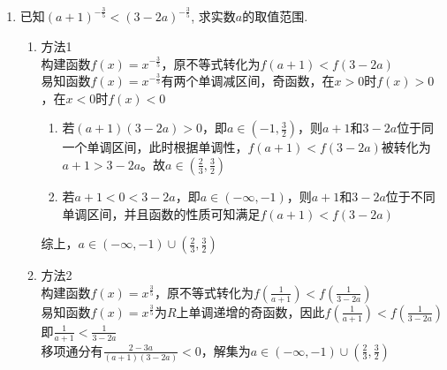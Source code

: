 \begin{enumerate}
\begin{jieda}
    任取实数集内的$x_1, x_2, x_1 < x_2$ \\
    $f(x_2)-f(x_1)=\frac{a}{a^2-1}\left(a^{x_2}-a^{x_1} - (a^{-x_2} - a^{-x_1})\right)$. 
    \begin{enumerate}
        \item 当$0 < a < 1$时,$a^{x_2}-a^{x_1} < 0$，$a^{-x_2} - a^{-x_1} > 0$，$\frac{a}{a^2-1} < 0$，故$f(x_2)-f(x_1) > 0$
        \item 当$a > 1$时,$a^{x_2}-a^{x_1} > 0$，$a^{-x_2} - a^{-x_1} < 0$，$\frac{a}{a^2-1} > 0$，故$f(x_2)-f(x_1) > 0$
    \end{enumerate}
    因此$f(x)$是$\bR$上为严格增函数. \\
    \ps $f(x)$并非恒正或者恒负，因此不应使用作商法.
    \end{jieda}
    \item 已知$(a+1)^{-\frac{3}{5}}<(3-2a)^{-\frac{3}{5}}$, 求实数$a$的取值范围. 
    \begin{jieda}
    \begin{enumerate}
        \item 方法1 \\
        构建函数$f(x) = x^{-\frac{3}{5}}$，原不等式转化为$f(a+1) < f(3-2a)$ \\
        易知函数$f(x) = x^{-\frac{3}{5}}$有两个单调减区间，奇函数，在$x > 0$时$f(x) > 0$，在$x < 0$时$f(x) < 0$ 
        \begin{enumerate}
            \item 若$(a+1)(3-2a) > 0$，即$a \in (-1, \frac{3}{2})$，则$a+1$和$3-2a$位于同一个单调区间，此时根据单调性，$f(a+1) < f(3-2a)$被转化为$a+1 > 3-2a$。故$a \in (\frac{2}{3}, \frac{3}{2})$
            \item 若$a+1< 0 < 3-2a$，即$a \in (-\infty, -1)$，则$a+1$和$3-2a$位于不同单调区间，并且函数的性质可知满足$f(a+1) < f(3-2a)$
        \end{enumerate}
        综上，$a \in (-\infty, -1) \cup (\frac{2}{3}, \frac{3}{2})$
        \item 方法2 \\
        构建函数$f(x) = x^{\frac{3}{5}}$，原不等式转化为$f(\frac{1}{a+1}) < f(\frac{1}{3-2a})$ \\
        易知函数$f(x) = x^{\frac{3}{5}}$为$R$上单调递增的奇函数，因此$f(\frac{1}{a+1}) < f(\frac{1}{3-2a})$即$\frac{1}{a+1} < \frac{1}{3-2a}$ \\
        移项通分有$\frac{2-3a}{(a+1)(3-2a)} < 0$，解集为$a \in (-\infty, -1) \cup (\frac{2}{3}, \frac{3}{2})$
    \end{enumerate}
    \end{jieda}

\end{enumerate}
